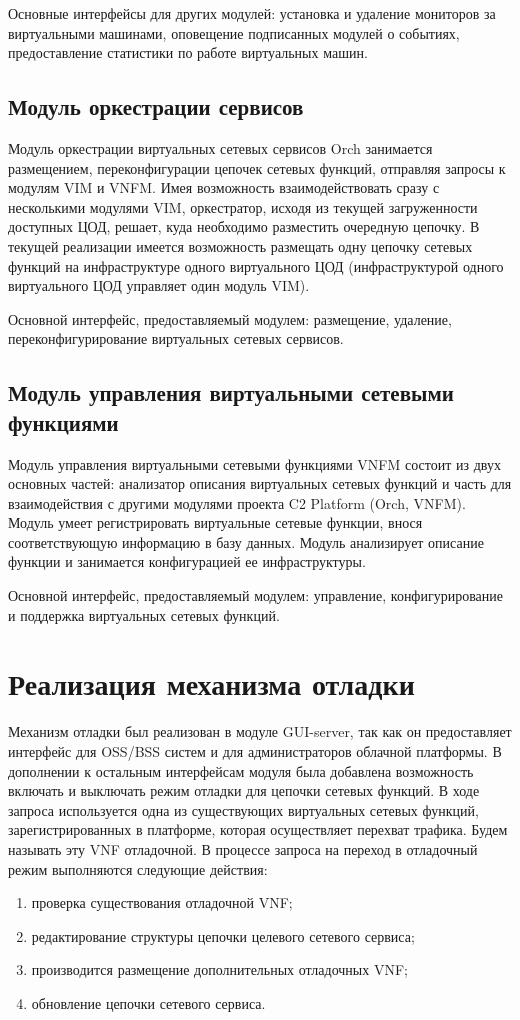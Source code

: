 \documentclass[oneside,final,14pt,a4paper]{extreport}
\begin{document}
Основные интерфейсы для других модулей: установка и удаление мониторов за виртуальными машинами, оповещение подписанных модулей о событиях, предоставление статистики по работе виртуальных машин.

\subsection{Модуль оркестрации сервисов}
Модуль оркестрации виртуальных сетевых сервисов Orch занимается размещением, переконфигурации цепочек сетевых функций, отправляя запросы к модулям VIM и VNFM. Имея возможность взаимодействовать сразу с несколькими модулями VIM, оркестратор, исходя из текущей загруженности доступных ЦОД, решает, куда необходимо разместить очередную цепочку. В текущей реализации имеется возможность размещать одну цепочку сетевых функций на инфраструктуре одного виртуального ЦОД (инфраструктурой одного виртуального ЦОД управляет один модуль VIM).

Основной интерфейс, предоставляемый модулем: размещение, удаление, переконфигурирование виртуальных сетевых сервисов.

\subsection{Модуль управления виртуальными сетевыми функциями}
Модуль управления виртуальными сетевыми функциями VNFM состоит из двух основных частей: анализатор описания виртуальных сетевых функций и часть для взаимодействия с другими модулями проекта C2 Platform (Orch, VNFM). Модуль умеет регистрировать виртуальные сетевые функции, внося соответствующую информацию в базу данных. Модуль анализирует описание функции и занимается конфигурацией ее инфраструктуры.

Основной интерфейс, предоставляемый модулем: управление, конфигурирование и поддержка виртуальных сетевых функций.


\section{Реализация механизма отладки}
\label{sec:developed_module}
Механизм отладки был реализован в модуле GUI-server, так как он предоставляет интерфейс для OSS/BSS систем и для администраторов облачной платформы.
В дополнении к остальным интерфейсам модуля была добавлена возможность включать и выключать режим отладки для цепочки сетевых функций. В ходе запроса используется одна из существующих виртуальных сетевых функций, зарегистрированных в платформе, которая осуществляет перехват трафика. Будем называть эту VNF отладочной. В процессе запроса на переход в отладочный режим выполняются следующие действия:
\begin{enumerate}
    \item проверка существования отладочной VNF;
    \item редактирование структуры цепочки целевого сетевого сервиса;
    \item производится размещение дополнительных отладочных VNF;
    \item обновление цепочки сетевого сервиса.
\end{enumerate}
\end{document}
